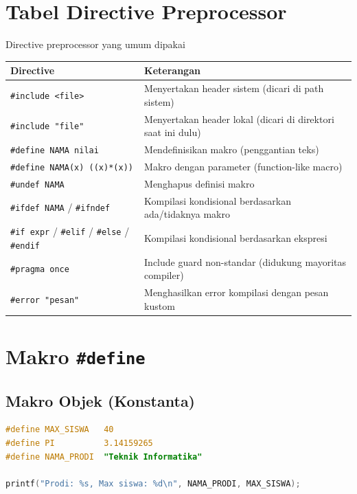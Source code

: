 \documentclass[../main.tex]{subfiles}
\begin{document}
\section{Tabel Directive Preprocessor}

\begin{modultable}[]{Directive preprocessor yang umum dipakai}
{\small
\begin{tabular}{|>{\raggedright\arraybackslash}p{3.6cm}|>{\raggedright\arraybackslash}p{9.4cm}|}
\hline
\textbf{Directive} & \textbf{Keterangan} \\
\hline
\texttt{\#include <file>} & Menyertakan header sistem (dicari di path sistem) \\
\hline
\texttt{\#include "file"} & Menyertakan header lokal (dicari di direktori saat ini dulu) \\
\hline
\texttt{\#define NAMA nilai} & Mendefinisikan makro (penggantian teks) \\
\hline
\texttt{\#define NAMA(x) ((x)*(x))} & Makro dengan parameter (function-like macro) \\
\hline
\texttt{\#undef NAMA} & Menghapus definisi makro \\
\hline
\texttt{\#ifdef NAMA} / \texttt{\#ifndef} & Kompilasi kondisional berdasarkan ada/tidaknya makro \\
\hline
\texttt{\#if expr} / \texttt{\#elif} / \texttt{\#else} / \texttt{\#endif} & Kompilasi kondisional berdasarkan ekspresi \\
\hline
\texttt{\#pragma once} & Include guard non-standar (didukung mayoritas compiler) \\
\hline
\texttt{\#error "pesan"} & Menghasilkan error kompilasi dengan pesan kustom \\
\hline
\end{tabular}
}
\end{modultable}

\section{Makro \texttt{\#define}}

\subsection{Makro Objek (Konstanta)}

\begin{lstlisting}[language=C,caption=Makro konstanta]
#define MAX_SISWA   40
#define PI          3.14159265
#define NAMA_PRODI  "Teknik Informatika"

printf("Prodi: %s, Max siswa: %d\n", NAMA_PRODI, MAX_SISWA);
\end{lstlisting}
\end{document}
